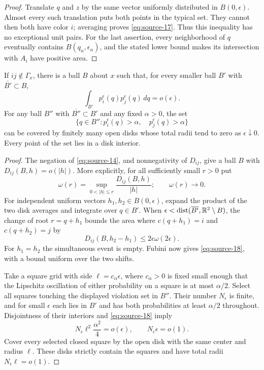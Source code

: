 \begin{proof}
Translate $q$ and $z$ by the same vector uniformly distributed in
$B(0,\epsilon)$.  Almost every such translation puts both points in
the typical set.  They cannot then both have color $i$; averaging
proves \eqref{eq:source-17}.  Thus this inequality has no exceptional
unit pairs.  For the last assertion, every neighborhood of $q$
eventually contains $B(q_n,\epsilon_n)$, and the stated lower bound
makes its intersection with $A_i$ have positive area.
\end{proof}

\begin{lemma}
\label{lem:transitions-missing-edge}
If $ij\notin\Gamma_x$, there is a ball $B$ about $x$ such that, for
every smaller ball $B'$ with $\overline{B'}\subset B$,
\begin{equation}
 \int_{B'}p_i^\epsilon(q)p_j^\epsilon(q)\,dq=o(\epsilon).
 \label{eq:source-18}
\end{equation}
For any ball $B''$ with $\overline{B''}\subset B'$ and any fixed
$\alpha>0$, the set
\[
 \{q\in B'':p_i^\epsilon(q)>\alpha,\quad
                    p_j^\epsilon(q)>\alpha\}
\]
can be covered by finitely many open disks whose total radii tend to
zero as $\epsilon\downarrow0$.  Every point of the set lies in a disk
interior.
\end{lemma}

\begin{proof}
The negation of \eqref{eq:source-14}, and nonnegativity of $D_{ij}$,
give a ball $B$ with $D_{ij}(B,h)=o(|h|)$.  More explicitly, for all
sufficiently small $r>0$ put
\[
 \omega(r)=\sup_{0<|h|\le r}\frac{D_{ij}(B,h)}{|h|};
 \qquad \omega(r)\longrightarrow0.
\]
For independent uniform vectors $h_1,h_2\in B(0,\epsilon)$, expand the
product of the two disk averages and integrate over $q\in B'$.  When
$\epsilon<\operatorname{dist}(\overline{B'},\mathbb R^2\setminus B)$, the change of root
$r=q+h_1$ bounds the area where $c(q+h_1)=i$ and $c(q+h_2)=j$ by
\[
 D_{ij}(B,h_2-h_1)\le 2\epsilon\omega(2\epsilon).
\]
For $h_1=h_2$ the simultaneous event is empty.  Fubini now gives
\eqref{eq:source-18}, with a bound uniform over the two shifts.

Take a square grid with side $\ell=c_\alpha\epsilon$, where
$c_\alpha>0$ is fixed small enough that the Lipschitz oscillation of
either probability on a square is at most $\alpha/2$.  Select all
squares touching the displayed violation set in $B''$.  Their number
$N_\epsilon$ is finite, and for small $\epsilon$ each lies in $B'$ and
has both probabilities at least $\alpha/2$ throughout.  Disjointness
of their interiors and \eqref{eq:source-18} imply
\[
 N_\epsilon\ell^2\frac{\alpha^2}{4}=o(\epsilon),
 \qquad N_\epsilon\epsilon=o(1).
\]
Cover every selected closed square by the open disk with the same
center and radius $\ell$.  These disks strictly contain the squares
and have total radii $N_\epsilon\ell=o(1)$.
\end{proof}

